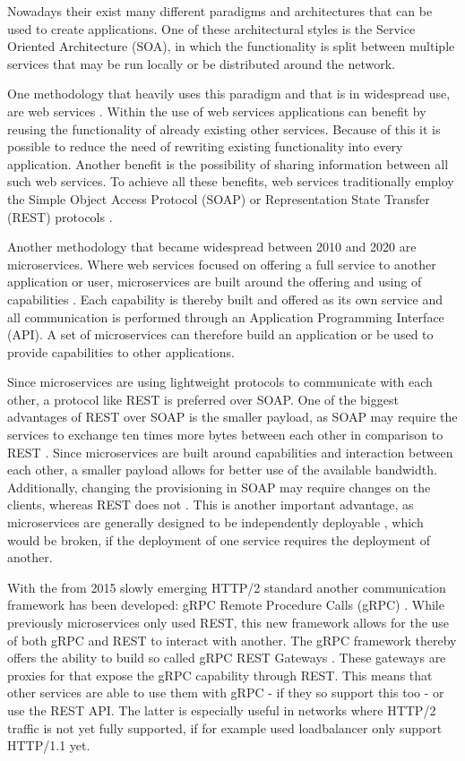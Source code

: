 \documentclass[conference]{IEEEtran}
\begin{document}
Nowadays their exist many different paradigms and architectures that can be used to create applications. One of these architectural styles is the Service Oriented Architecture (SOA), in which the functionality is split between multiple services that may be run locally or be distributed around the network.

One methodology that heavily uses this paradigm and that is in widespread use, are web services \cite{halili2018web}. Within the use of web services applications can benefit by reusing the functionality of already existing other services. Because of this it is possible to reduce the need of rewriting existing functionality into every application. Another benefit is the possibility of sharing information between all such web services. To achieve all these benefits, web services traditionally employ the Simple Object Access Protocol (SOAP) or Representation State Transfer (REST) protocols \cite{halili2018web}.

Another methodology that became widespread between 2010 and 2020 are microservices. Where web services focused on offering a full service to another application or user, microservices are built around the offering and using of capabilities \cite{karmel2016nist}. Each capability is thereby built and offered as its own service and all communication is performed through an Application Programming Interface (API). A set of microservices can therefore build an application or be used to provide capabilities to other applications.

Since microservices are using lightweight protocols \cite{karmel2016nist} to communicate with each other, a protocol like REST is preferred over SOAP. One of the biggest advantages of REST over SOAP is the smaller payload, as SOAP may require the services to exchange ten times more bytes between each other in comparison to REST \cite{halili2018web}. Since microservices are built around capabilities and interaction between each other, a smaller payload allows for better use of the available bandwidth.
Additionally, changing the provisioning in SOAP may require changes on the clients, whereas REST does not \cite{halili2018web}. This is another important advantage, as microservices are generally designed to be independently deployable \cite{karmel2016nist}, which would be broken, if the deployment of one service requires the deployment of another.

With the from 2015 slowly emerging HTTP/2 standard \cite{rfc7540} another communication framework has been developed: gRPC Remote Procedure Calls (gRPC) \cite{GRPCAuthors2020}. While previously microservices only used REST, this new framework allows for the use of both gRPC and REST to interact with another. The gRPC framework thereby offers the ability to build so called gRPC REST Gateways \cite{grpcrest}. These gateways are proxies for that expose the gRPC capability through REST. This means that other services are able to use them with gRPC - if they so support this too - or use the REST API. The latter is especially useful in networks where HTTP/2 traffic is not yet fully supported, if for example used loadbalancer only support HTTP/1.1 yet.
\end{document}
